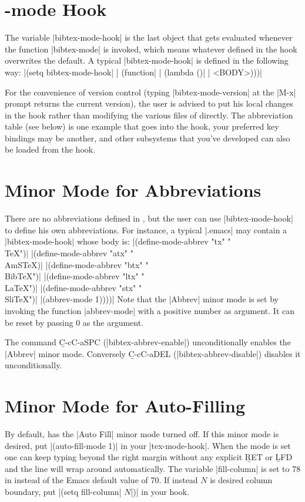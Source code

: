 \section{{\Mbf}-mode Hook}
\noindent
The variable |bibtex-mode-hook| is the last object that gets evaluated 
whenever the function |bibtex-mode| is invoked,
which means whatever defined in the hook overwrites the
default.  A typical |bibtex-mode-hook| is defined in the following way:
\begindisplay
|(setq bibtex-mode-hook|\cr
|  (function|\cr
|    (lambda ()|\cr
|      <BODY>)))|\cr
\enddisplay

For the convenience of version control (typing |bibtex-mode-version|
at the |M-x| prompt returns the current {\BM} version),
the user is advised to put his local changes in the hook
rather than modifying the various files of {\BM} directly.
The abbreviation table (see below)
is one example that goes into the hook, your preferred key bindings may be
another, and other {\BM} subsystems that you've developed can also be loaded
from the hook.


\section{Minor Mode for Abbreviations}
\noindent
There are no abbreviations defined in {\BM},
but the user can use |bibtex-mode-hook| to define his own abbreviations.
For instance, a typical |.emacs| may contain a |bibtex-mode-hook| whose
body is:
\begindisplay
|(define-mode-abbrev "tx"  "{\\TeX}")|\cr
|(define-mode-abbrev "atx" "{\\AmSTeX})|\cr
|(define-mode-abbrev "btx" "{\\BibTeX}")|\cr
|(define-mode-abbrev "ltx" "{\\LaTeX}")|\cr
|(define-mode-abbrev "stx" "{\\SliTeX}")|\cr
|(abbrev-mode 1))))|\cr
\enddisplay
Note that the |Abbrev| minor mode is set by invoking 
the function |abbrev-mode| with a positive number as argument.
It can be reset by passing $0$ as the argument.

The command {\b C-c{\s}C-a{\s}SPC} (|bibtex-abbrev-enable|) unconditionally
enables the |Abbrev| minor mode.  Conversely {\b C-c{\s}C-a{\s}DEL}
(|bibtex-abbrev-disable|) disables it unconditionally.\


\section{Minor Mode for Auto-Filling}
\noindent
By default, {\BM} has the |Auto Fill| minor mode turned off.
If this minor mode is desired, put
\begindisplay
|(auto-fill-mode 1)|\cr
\enddisplay
in your |tex-mode-hook|.  When the mode is set one
can keep typing beyond the right margin without any explicit {\b RET} or
{\b LFD} and the line will wrap around automatically.
The variable |fill-column| is set to 78 in {\BM} instead of the Emacs default
value of 70.
If instead $N$ is desired column boundary, put
\begindisplay
|(setq fill-column| $N$|)|\cr
\enddisplay
in your hook.

